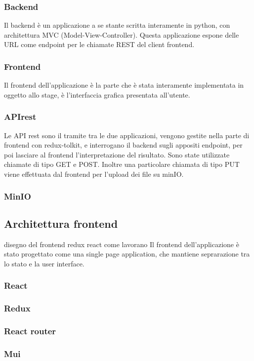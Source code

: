 \subsubsection*{Backend}
Il backend è un applicazione a se stante scritta interamente in python, con architettura MVC (Model-View-Controller). Questa applicazione
espone delle URL come endpoint per le chiamate REST del client frontend.
\subsubsection*{Frontend}
Il frontend dell'applicazione è la parte che è stata interamente implementata in oggetto allo stage, è l'interfaccia grafica
presentata all'utente.
\subsubsection*{APIrest}
Le API rest sono il tramite tra le due applicazioni, vengono gestite nella parte di frontend con redux-tolkit, e interrogano
il backend sugli appositi endpoint, per poi lasciare al frontend l'interpretazione del risultato. Sono state utilizzate chiamate di
tipo GET e POST. Inoltre una particolare chiamata di tipo PUT viene effettuata dal frontend per l'upload dei file su minIO.
\subsubsection*{MinIO}
\subsection{Architettura frontend}
disegno del frontend redux react come lavorano
Il frontend dell'applicazione è stato progettato come una single page application, che mantiene seprarazione tra lo stato e la
user interface.
\subsubsection*{React}
\subsubsection*{Redux}
\subsubsection*{React router}
\subsubsection*{Mui}
